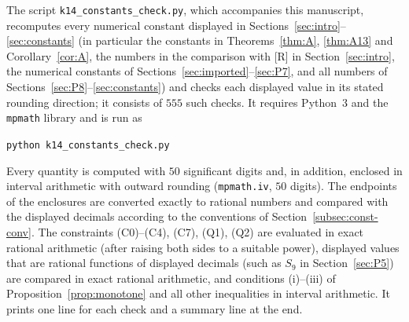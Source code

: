 \documentclass[11pt]{amsart}
\theoremstyle{definition}
\theoremstyle{remark}
\numberwithin{equation}{section}
\begin{document}
The script \texttt{k14\_constants\_check.py}, which accompanies this manuscript, recomputes every numerical constant
displayed in Sections~\ref{sec:intro}--\ref{sec:constants} (in particular the constants in Theorems~\ref{thm:A},
\ref{thm:A13} and Corollary~\ref{cor:A}, the numbers in the comparison with [R] in Section~\ref{sec:intro}, the
numerical constants of Sections~\ref{sec:imported}--\ref{sec:P7}, and all numbers of
Sections~\ref{sec:P8}--\ref{sec:constants}) and checks each displayed value in its stated rounding direction; it
consists of $555$ such checks. It requires Python~3 and the \texttt{mpmath} library and is run as
\begin{center}
\texttt{python k14\_constants\_check.py}
\end{center}
Every quantity is computed with $50$ significant digits and, in addition, enclosed in interval arithmetic with outward
rounding (\texttt{mpmath.iv}, $50$ digits). The endpoints of the enclosures are converted exactly to rational numbers
and compared with the displayed decimals according to the conventions of Section~\ref{subsec:const-conv}. The
constraints (C0)--(C4), (C7), (Q1), (Q2) are evaluated in exact rational arithmetic (after raising both sides to a
suitable power), displayed values that are rational functions of displayed decimals (such as $S_9$ in
Section~\ref{sec:P5}) are compared in exact rational arithmetic, and conditions (i)--(iii) of
Proposition~\ref{prop:monotone} and all other inequalities in interval arithmetic. It prints one line for each check
and a summary line at the end.
\end{document}

